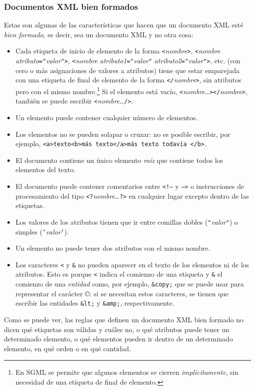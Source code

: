 \subsubsection{Documentos XML bien formados} Estas son algunas de las características que hacen que un documento XML esté \emph{bien formado}, es decir, sea un documento XML y no otra cosa: \begin{itemize} \item Cada etiqueta de inicio de elemento de la forma \texttt{<}\emph{nombre}\texttt{>}, \texttt{<}\emph{nombre} \emph{atributo}\texttt{=}\texttt{"}\emph{valor}\texttt{"}\texttt{>}, \texttt{<}\emph{nombre} \emph{atributo1}\texttt{=}\texttt{"}\emph{valor}\texttt{"} \emph{atributo2}\texttt{=}\texttt{"}\emph{valor}\texttt{"}\texttt{>}, etc. (con cero o más asignaciones de valores a atributos) tiene que estar emparejada con una etiqueta de final de elemento de la forma \texttt{</}\emph{nombre}\texttt{>}, sin atributos pero con el mismo nombre.\footnote{En SGML se permite que algunos elementos se cierren \emph{implícitamente}, sin necesidad de una etiqueta de final de elemento.} Si el elemento está vacío, \texttt{<}\emph{nombre}\ldots\texttt{></}\emph{nombre}\texttt{>}, también se puede escribir \texttt{<}\emph{nombre}\ldots\texttt{/>}. \item Un elemento puede contener cualquier número de elementos. \item Los elementos no se pueden solapar o cruzar: no es posible escribir, por ejemplo, \texttt{<a>texto<b>más texto</a>más texto todavía </b>}. \item El documento contiene un único elemento \emph{raíz} que contiene todos los elementos del texto. \item El documento puede contener comentarios entre \texttt{<!--} y \texttt{-->} o instrucciones de procesamiento del tipo \texttt{<?}\emph{nombre}\ldots\texttt{?>} en cualquier lugar excepto dentro de las etiquetas. \item Los valores de los atributos tienen que ir entre comillas dobles (\texttt{"}\emph{valor}\texttt{"}) o simples (\texttt{'}\emph{valor}\texttt{'}). \item Un elemento no puede tener dos atributos con el mismo nombre. \item Los caracteres \texttt{<} y \texttt{\&} no pueden aparecer en el texto de los elementos ni de los atributos. Esto es porque \texttt{<} indica el comienzo de una etiqueta y \texttt{\&} el comienzo de una \emph{entidad} como, por ejemplo, \texttt{\&copy;} que se puede usar para representar el carácter \emph{©}: si se necesitan estos caracteres, se tienen que escribir las entidades \texttt{\&lt;} y \texttt{\&amp;}, respectivamente. \end{itemize} Como se puede ver, las reglas que definen un documento XML bien formado no dicen qué etiquetas son válidas y cuáles no, o qué atributos puede tener un determinado elemento, o qué elementos pueden ir dentro de un determinado elemento, en qué orden o en qué cantidad. 

